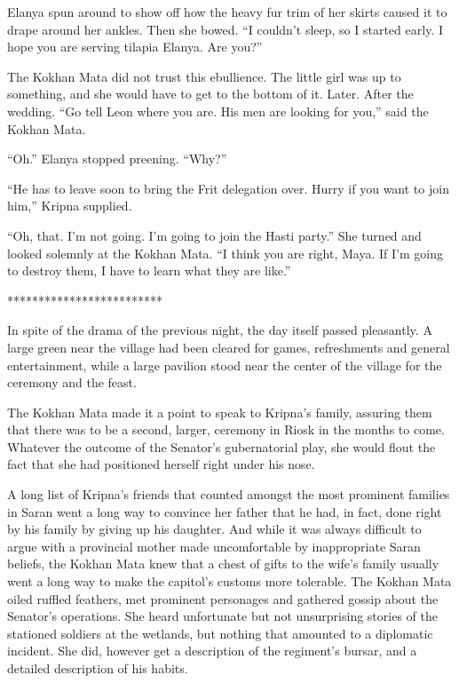 \documentclass{article}
\begin{document}
	Elanya spun around to show off how the heavy fur trim of her skirts caused it to drape around her ankles. Then she bowed. “I couldn’t sleep, so I started early. I hope you are serving tilapia Elanya. Are you?”
	
	The Kokhan Mata did not trust this ebullience. The little girl was up to something, and she would have to get to the bottom of it. Later. After the wedding. “Go tell Leon where you are. His men are looking for you,” said the Kokhan Mata.
	
	“Oh.” Elanya stopped preening. “Why?”
	
	“He has to leave soon to bring the Frit delegation over. Hurry if you want to join him,” Kripna supplied. 
	
	“Oh, that. I’m not going. I’m going to join the Hasti party.” She turned and looked solemnly at the Kokhan Mata. “I think you are right, Maya. If I’m going to destroy them, I have to learn what they are like.” 
	
	*************************
	
	In spite of the drama of the previous night, the day itself passed pleasantly. A large green near the village had been cleared for games, refreshments and general entertainment, while a large pavilion stood near the center of the village for the ceremony and the feast.
	
	The Kokhan Mata made it a point to speak to Kripna’s family, assuring them that there was to be a second, larger, ceremony in Riosk in the months to come. Whatever the outcome of the Senator’s gubernatorial play, she would flout the fact that she had positioned herself right under his nose.
	
	A long list of Kripna’s friends that counted amongst the most prominent families in Saran went a long way to convince her father that he had, in fact, done right by his family by giving up his  daughter. And while it was always difficult to argue with a provincial mother made uncomfortable by inappropriate Saran beliefs, the Kokhan Mata knew that a chest of gifts to the wife's family usually went a long way to make the capitol's customs more tolerable.
	The Kokhan Mata oiled ruffled feathers, met prominent personages and gathered gossip about the Senator’s operations. She heard unfortunate but not unsurprising stories of the stationed soldiers at the wetlands, but nothing that amounted to a diplomatic incident. She did, however get a description of the regiment’s bursar, and a detailed description of his habits.
	
\end{document}
